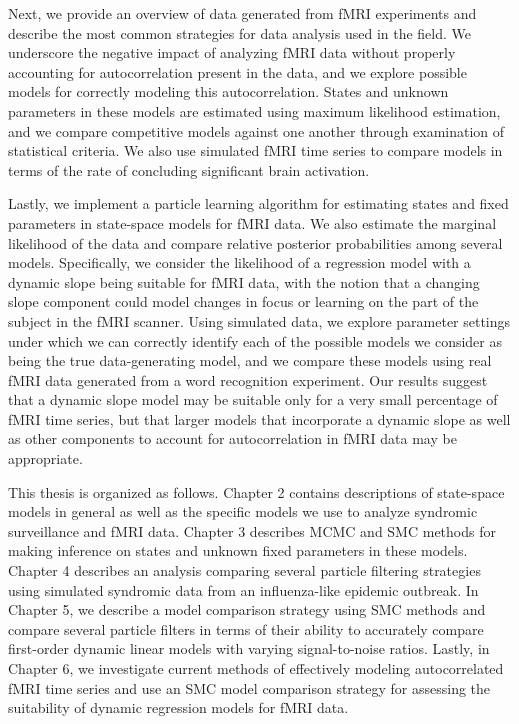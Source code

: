 Next, we provide an overview of data generated from fMRI experiments and describe the most common strategies for data analysis used in the field. We underscore the negative impact of analyzing fMRI data without properly accounting for autocorrelation present in the data, and we explore possible models for correctly modeling this autocorrelation. States and unknown parameters in these models are estimated using maximum likelihood estimation, and we compare competitive models against one another through examination of statistical criteria. We also use simulated fMRI time series to compare models in terms of the rate of concluding significant brain activation.

Lastly, we implement a particle learning algorithm for estimating states and fixed parameters in state-space models for fMRI data. We also estimate the marginal likelihood of the data and compare relative posterior probabilities among several models. Specifically, we consider the likelihood of a regression model with a dynamic slope being suitable for fMRI data, with the notion that a changing slope component could model changes in focus or learning on the part of the subject in the fMRI scanner. Using simulated data, we explore parameter settings under which we can correctly identify each of the possible models we consider as being the true data-generating model, and we compare these models using real fMRI data generated from a word recognition experiment. Our results suggest that a dynamic slope model may be suitable only for a very small percentage of fMRI time series, but that larger models that incorporate a dynamic slope as well as other components to account for autocorrelation in fMRI data may be appropriate.

This thesis is organized as follows. Chapter 2 contains descriptions of state-space models in general as well as the specific models we use to analyze syndromic surveillance and fMRI data. Chapter 3 describes MCMC and SMC methods for making inference on states and unknown fixed parameters in these models. Chapter 4 describes an analysis comparing several particle filtering strategies using simulated syndromic data from an influenza-like epidemic outbreak. In Chapter 5, we describe a model comparison strategy using SMC methods and compare several particle filters in terms of their ability to accurately compare first-order dynamic linear models with varying signal-to-noise ratios. Lastly, in Chapter 6, we investigate current methods of effectively modeling autocorrelated fMRI time series and use an SMC model comparison strategy for assessing the suitability of dynamic regression models for fMRI data. 
